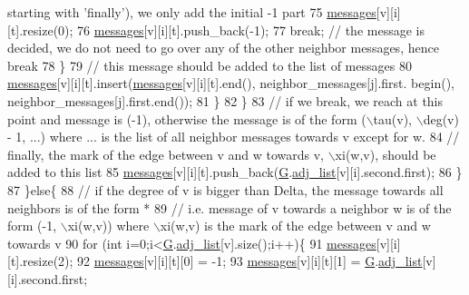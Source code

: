 \begin{DoxyCode}
{       starting with 'finally'), we only add the initial -1 part}
75                 \hyperlink{classgraph__message_a06a1d1ab91b4891c65ea80205566f800}{messages}[v][i][t].resize(0);
76                 \hyperlink{classgraph__message_a06a1d1ab91b4891c65ea80205566f800}{messages}[v][i][t].push\_back(-1);
77                 \textcolor{keywordflow}{break}; \textcolor{comment}{// the message is decided, we do not need to go over any of the other neighbor
       messages, hence break}
78               \}
79               \textcolor{comment}{// this message should be added to the list of messages}
80               \hyperlink{classgraph__message_a06a1d1ab91b4891c65ea80205566f800}{messages}[v][i][t].insert(\hyperlink{classgraph__message_a06a1d1ab91b4891c65ea80205566f800}{messages}[v][i][t].end(), neighbor\_messages[j].first.
      begin(), neighbor\_messages[j].first.end());
81             \}
82           \}
83           \textcolor{comment}{// if we break, we reach at this point and message is (-1), otherwise the message is of the form
       (\(\backslash\)tau(v), \(\backslash\)deg(v) - 1, ...) where ... is the list of all neighbor messages towards v except for w. }
84           \textcolor{comment}{// finally, the mark of the edge between v and w towards v, \(\backslash\)xi(w,v), should be added to this
       list}
85           \hyperlink{classgraph__message_a06a1d1ab91b4891c65ea80205566f800}{messages}[v][i][t].push\_back(\hyperlink{classgraph__message_abffce6d6a7868da0e747425569759f0f}{G}.\hyperlink{classmarked__graph_a1a0bf7ca413a278763f7c878b3b6fd6f}{adj\_list}[v][i].second.first);
86         \}
87       \}\textcolor{keywordflow}{else}\{
88         \textcolor{comment}{// if the degree of v is bigger than Delta, the message towards all neighbors is of the form *}
89         \textcolor{comment}{// i.e. message of v towards a neighbor w is of the form (-1, \(\backslash\)xi(w,v)) where \(\backslash\)xi(w,v) is the mark
       of the edge between v and w towards v}
90         \textcolor{keywordflow}{for} (\textcolor{keywordtype}{int} i=0;i<\hyperlink{classgraph__message_abffce6d6a7868da0e747425569759f0f}{G}.\hyperlink{classmarked__graph_a1a0bf7ca413a278763f7c878b3b6fd6f}{adj\_list}[v].size();i++)\{
91           \hyperlink{classgraph__message_a06a1d1ab91b4891c65ea80205566f800}{messages}[v][i][t].resize(2);
92           \hyperlink{classgraph__message_a06a1d1ab91b4891c65ea80205566f800}{messages}[v][i][t][0] = -1;
93           \hyperlink{classgraph__message_a06a1d1ab91b4891c65ea80205566f800}{messages}[v][i][t][1] = \hyperlink{classgraph__message_abffce6d6a7868da0e747425569759f0f}{G}.\hyperlink{classmarked__graph_a1a0bf7ca413a278763f7c878b3b6fd6f}{adj\_list}[v][i].second.first;

\end{DoxyCode}
